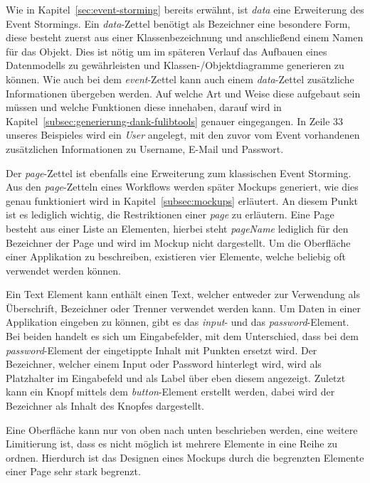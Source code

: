 
Wie in Kapitel~\ref{sec:event-storming} bereits erwähnt, ist \textit{data} eine Erweiterung des Event Stormings.
Ein \textit{data}-Zettel benötigt als Bezeichner eine besondere Form, diese besteht zuerst aus einer Klassenbezeichnung und anschließend einem Namen für das Objekt.
Dies ist nötig um im späteren Verlauf das Aufbauen eines Datenmodells zu gewährleisten und Klassen-/Objektdiagramme generieren zu können.
Wie auch bei dem \textit{event}-Zettel kann auch einem \textit{data}-Zettel zusätzliche Informationen übergeben werden.
Auf welche Art und Weise diese aufgebaut sein müssen und welche Funktionen diese innehaben, darauf wird in Kapitel~\ref{subsec:generierung-dank-fulibtools} genauer eingegangen.
In Zeile 33 unseres Beispieles wird ein \textit{User} angelegt, mit den zuvor vom Event vorhandenen zusätzlichen Informationen zu Username, E-Mail und Passwort.


Der \textit{page}-Zettel ist ebenfalls eine Erweiterung zum klassischen Event Storming.
Aus den \textit{page}-Zetteln eines Workflows werden später Mockups generiert, wie dies genau funktioniert wird in Kapitel~\ref{subsec:mockups} erläutert.
An diesem Punkt ist es lediglich wichtig, die Restriktionen einer \textit{page} zu erläutern.
Eine Page besteht aus einer Liste an Elementen, hierbei steht \textit{pageName} lediglich für den Bezeichner der Page und wird im Mockup nicht dargestellt.
Um die Oberfläche einer Applikation zu beschreiben, existieren vier Elemente, welche beliebig oft verwendet werden können.

Ein Text Element kann enthält einen Text, welcher entweder zur Verwendung als Überschrift, Bezeichner oder Trenner verwendet werden kann.
Um Daten in einer Applikation eingeben zu können, gibt es das \textit{input}- und das \textit{password}-Element.
Bei beiden handelt es sich um Eingabefelder, mit dem Unterschied, dass bei dem \textit{password}-Element der eingetippte Inhalt mit Punkten ersetzt wird.
Der Bezeichner, welcher einem Input oder Password hinterlegt wird, wird als Platzhalter im Eingabefeld und als Label über eben diesem angezeigt.
Zuletzt kann ein Knopf mittels dem \textit{button}-Element erstellt werden, dabei wird der Bezeichner als Inhalt des Knopfes dargestellt.

Eine Oberfläche kann nur von oben nach unten beschrieben werden, eine weitere Limitierung ist, dass es nicht möglich ist mehrere Elemente in eine Reihe zu ordnen.
Hierdurch ist das Designen eines Mockups durch die begrenzten Elemente einer Page sehr stark begrenzt.
